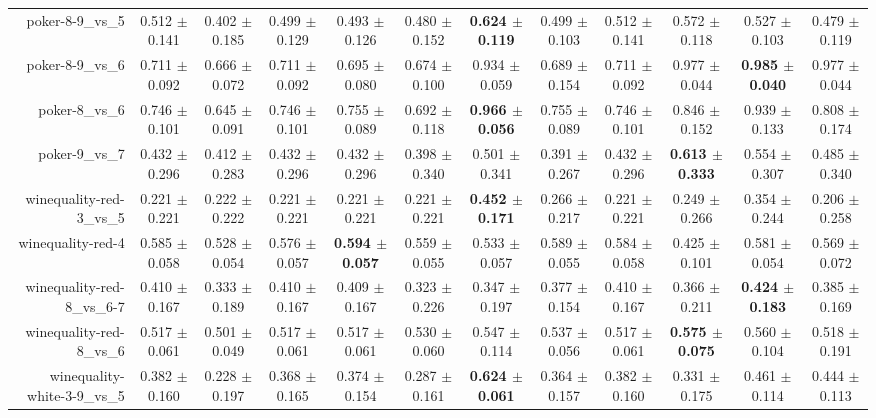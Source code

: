 \begin{table}[!ht]
{\begin{tabular}{r c c c c c c c c c c c}
poker-8-9\_vs\_5 & 0.512 $\pm$ 0.141 & 0.402 $\pm$ 0.185 & 0.499 $\pm$ 0.129 & 0.493 $\pm$ 0.126 & 0.480 $\pm$ 0.152 & \textbf{0.624 $\pm$ 0.119} & 0.499 $\pm$ 0.103 & 0.512 $\pm$ 0.141 & 0.572 $\pm$ 0.118 & 0.527 $\pm$ 0.103 & 0.479 $\pm$ 0.119 \\
poker-8-9\_vs\_6 & 0.711 $\pm$ 0.092 & 0.666 $\pm$ 0.072 & 0.711 $\pm$ 0.092 & 0.695 $\pm$ 0.080 & 0.674 $\pm$ 0.100 & 0.934 $\pm$ 0.059 & 0.689 $\pm$ 0.154 & 0.711 $\pm$ 0.092 & 0.977 $\pm$ 0.044 & \textbf{0.985 $\pm$ 0.040} & 0.977 $\pm$ 0.044 \\
poker-8\_vs\_6 & 0.746 $\pm$ 0.101 & 0.645 $\pm$ 0.091 & 0.746 $\pm$ 0.101 & 0.755 $\pm$ 0.089 & 0.692 $\pm$ 0.118 & \textbf{0.966 $\pm$ 0.056} & 0.755 $\pm$ 0.089 & 0.746 $\pm$ 0.101 & 0.846 $\pm$ 0.152 & 0.939 $\pm$ 0.133 & 0.808 $\pm$ 0.174 \\
poker-9\_vs\_7 & 0.432 $\pm$ 0.296 & 0.412 $\pm$ 0.283 & 0.432 $\pm$ 0.296 & 0.432 $\pm$ 0.296 & 0.398 $\pm$ 0.340 & 0.501 $\pm$ 0.341 & 0.391 $\pm$ 0.267 & 0.432 $\pm$ 0.296 & \textbf{0.613 $\pm$ 0.333} & 0.554 $\pm$ 0.307 & 0.485 $\pm$ 0.340 \\
winequality-red-3\_vs\_5 & 0.221 $\pm$ 0.221 & 0.222 $\pm$ 0.222 & 0.221 $\pm$ 0.221 & 0.221 $\pm$ 0.221 & 0.221 $\pm$ 0.221 & \textbf{0.452 $\pm$ 0.171} & 0.266 $\pm$ 0.217 & 0.221 $\pm$ 0.221 & 0.249 $\pm$ 0.266 & 0.354 $\pm$ 0.244 & 0.206 $\pm$ 0.258 \\
winequality-red-4 & 0.585 $\pm$ 0.058 & 0.528 $\pm$ 0.054 & 0.576 $\pm$ 0.057 & \textbf{0.594 $\pm$ 0.057} & 0.559 $\pm$ 0.055 & 0.533 $\pm$ 0.057 & 0.589 $\pm$ 0.055 & 0.584 $\pm$ 0.058 & 0.425 $\pm$ 0.101 & 0.581 $\pm$ 0.054 & 0.569 $\pm$ 0.072 \\
winequality-red-8\_vs\_6-7 & 0.410 $\pm$ 0.167 & 0.333 $\pm$ 0.189 & 0.410 $\pm$ 0.167 & 0.409 $\pm$ 0.167 & 0.323 $\pm$ 0.226 & 0.347 $\pm$ 0.197 & 0.377 $\pm$ 0.154 & 0.410 $\pm$ 0.167 & 0.366 $\pm$ 0.211 & \textbf{0.424 $\pm$ 0.183} & 0.385 $\pm$ 0.169 \\
winequality-red-8\_vs\_6 & 0.517 $\pm$ 0.061 & 0.501 $\pm$ 0.049 & 0.517 $\pm$ 0.061 & 0.517 $\pm$ 0.061 & 0.530 $\pm$ 0.060 & 0.547 $\pm$ 0.114 & 0.537 $\pm$ 0.056 & 0.517 $\pm$ 0.061 & \textbf{0.575 $\pm$ 0.075} & 0.560 $\pm$ 0.104 & 0.518 $\pm$ 0.191 \\
winequality-white-3-9\_vs\_5 & 0.382 $\pm$ 0.160 & 0.228 $\pm$ 0.197 & 0.368 $\pm$ 0.165 & 0.374 $\pm$ 0.154 & 0.287 $\pm$ 0.161 & \textbf{0.624 $\pm$ 0.061} & 0.364 $\pm$ 0.157 & 0.382 $\pm$ 0.160 & 0.331 $\pm$ 0.175 & 0.461 $\pm$ 0.114 & 0.444 $\pm$ 0.113 \\

\end{tabular}}
\end{table}
